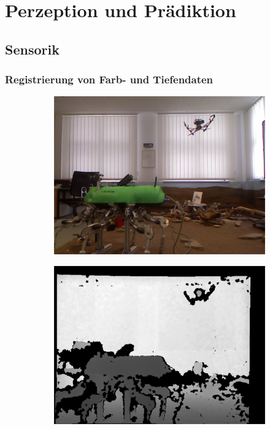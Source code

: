 \chapter{Perzeption und Prädiktion}
\label{chap:perzeption_praediktion}

\section{Sensorik}
\label{sec:sensorik}


\subsection{Registrierung von Farb- und Tiefendaten}

\begin{figure}[htbp]
	\centering
	\begin{subfigure}[t]{0.31\textwidth}
		\includegraphics[width=\textwidth]{04_images/motion_prediction/rgbd_example_rgb}
	\end{subfigure}
	\begin{subfigure}[t]{0.31\textwidth}
		\includegraphics[width=\textwidth]{04_images/motion_prediction/rgbd_example_depth}

\end{subfigure}
\end{figure}
